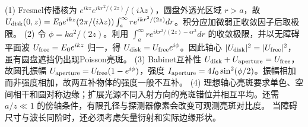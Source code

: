 (1) Fresnel传播核为 \(e^{ikz}e^{ikr^2/(2z)}/(i\lambda z)\)，圆盘外透光区域 \(r>a\)，故 \(U_{\rm disk}(0,z)=E_0e^{ikz}(2\pi/(i\lambda z))\int_a^\infty r e^{ikr^2/(2z)}dr\)。积分应加微弱正收敛因子后取极限。
(2) 令 \(\phi=ka^2/(2z)\)。利用 \(\int_a^\infty r e^{ikr^2/(2z)-\epsilon r^2}dr\) 的收敛极限，并以无障碍平面波 \(U_{\rm free}=E_0e^{ikz}\) 归一，得 \(U_{\rm disk}=U_{\rm free}e^{i\phi}\)。因此轴心 \(|U_{\rm disk}|^2=|U_{\rm free}|^2\)，虽有圆盘遮挡仍出现Poisson亮斑。
(3) Babinet互补性 \(U_{\rm disk}+U_{\rm aperture}=U_{\rm free}\)，故圆孔振幅 \(U_{\rm aperture}=U_{\rm free}(1-e^{i\phi})\)，强度 \(I_{\rm aperture}=4I_0\sin^2(\phi/2)\)。振幅相加而非强度相加，故两互补物体的强度一般不互补。
(4) 理想轴心亮斑要求单色、空间相干和圆对称边缘；扩展光源不同入射方向的亮斑错位并相互平均。还需 \(a/z\ll1\) 的傍轴条件，有限孔径与探测器像素会改变可观测亮斑对比度。 当障碍尺寸与波长同阶时，还必须考虑矢量衍射和实际边缘形状。
